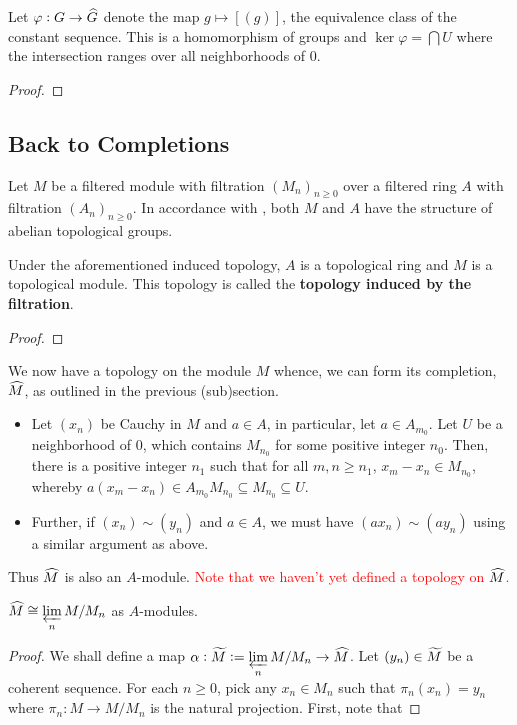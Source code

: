 \begin{proposition}
    Let $\varphi: G\to\widehat{G}$ denote the map $g\mapsto[(g)]$, the equivalence class of the constant sequence. This is a homomorphism of groups and $\ker\varphi = \bigcap U$ where the intersection ranges over all neighborhoods of $0$.
\end{proposition}
\begin{proof}
\end{proof}

\subsection*{Back to Completions}

Let $M$ be a filtered module with filtration $(M_n)_{n\ge 0}$ over a filtered ring $A$ with filtration $(A_n)_{n\ge 0}$. In accordance with , both $M$ and $A$ have the structure of abelian topological groups.

\begin{proposition}
    Under the aforementioned induced topology, $A$ is a topological ring and $M$ is a topological module. This topology is called the \textbf{topology induced by the filtration}.
\end{proposition}
\begin{proof}
\end{proof}

We now have a topology on the module $M$ whence, we can form its completion, $\widehat{M}$, as outlined in the previous (sub)section.
\begin{itemize}
    \item Let $(x_n)$ be Cauchy in $M$ and $a\in A$, in particular, let $a\in A_{m_0}$. Let $U$ be a neighborhood of $0$, which contains $M_{n_0}$ for some positive integer $n_0$. Then, there is a positive integer $n_1$ such that for all $m,n\ge n_1$, $x_m - x_n\in M_{n_0}$, whereby $a(x_m - x_n)\in A_{m_0}M_{n_0}\subseteq M_{n_0}\subseteq U$.

    \item Further, if $(x_n)\sim (y_n)$ and $a\in A$, we must have $(ax_n)\sim (ay_n)$ using a similar argument as above.
\end{itemize}

Thus $\widehat{M}$ is also an $A$-module. \textcolor{red}{Note that we haven't yet defined a topology on $\widehat{M}$.}

\begin{proposition}
    $\displaystyle\widehat{M}\cong\varprojlim_n M/M_n$ as $A$-modules.
\end{proposition}
\begin{proof}
    We shall define a map $\displaystyle\alpha: \widetilde{M}:=\varprojlim_{n}M/M_n\to\widehat{M}$. Let $(y_n)\in\widetilde{M}$ be a coherent sequence. For each $n\ge 0$, pick any $x_n\in M_n$ such that $\pi_n(x_n) = y_n$ where $\pi_n: M\to M/M_n$ is the natural projection. First, note that 
\end{proof}

